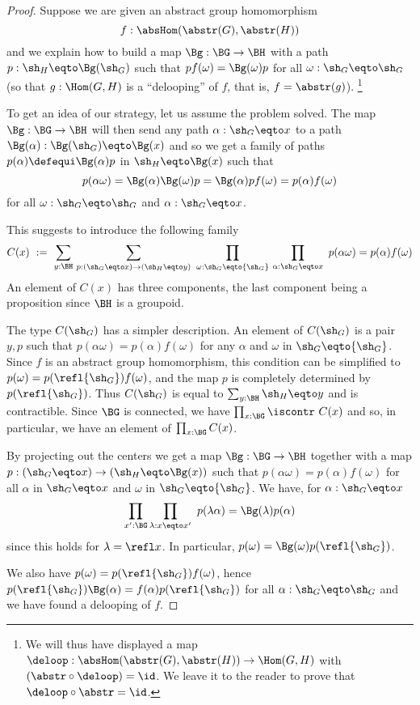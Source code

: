 \begin{proof}
  Suppose we are given an abstract group homomorphism
$$f:\absHom(\abstr(G),\abstr(H))$$
and we explain how to build a map $\Bg:\BG \rightarrow \BH$ with
a path $p:\sh_H \eqto \Bg(\sh_G)$ such that $p f(\omega) = \Bg(\omega) p$
for all $\omega:\sh_G \eqto \sh_G$ (so that $g:\Hom(G,H)$ is a ``delooping'' of $f$, 
that is, $f=\abstr(g)$).%
\footnote{We will thus have displayed a map
$\deloop:\absHom(\abstr(G),\abstr(H))\to\Hom(G,H)$ with 
$({\abstr}\circ\deloop)=\id$. We leave it to the reader 
to prove that $\deloop\circ{\abstr}=\id$. }

To get an idea of our strategy, let us assume the problem solved. The map $\Bg:\BG\rightarrow \BH$
will then send any path $\alpha:\sh_G \eqto x$ to a path $\Bg(\alpha):\Bg(\sh_G) \eqto \Bg(x)$
and so we get a family of paths $p(\alpha) \defequi \Bg(\alpha) p$ in ${\sh_H} \eqto \Bg(x)$ such that
$$p(\alpha\omega) = \Bg(\alpha)\Bg(\omega)p
  = \Bg(\alpha)pf(\omega) = p(\alpha)f(\omega)$$
for all $\omega:\sh_G \eqto \sh_G$ and $\alpha : \sh_G \eqto x$.

This suggests to introduce the following family
$$
C(x)~:=~ \sum_{y:\BH}\,\sum_{p:(\sh_G \eqto x)\rightarrow (\sh_H \eqto y)}~\prod_{\omega:\sh_G \eqto {\sh_G}}\,\prod_{\alpha:\sh_G \eqto x}~
 p(\alpha\omega) = p(\alpha)f(\omega)
$$
 An element of $C(x)$ has three components, the last component being
 a proposition since $\BH$ is a groupoid.

 The type $C({\sh_G})$ has a simpler description. An element of $C({\sh_G})$ is
 a pair $y,p$ such that $p(\alpha\omega) = p(\alpha)f(\omega)$ for
 any $\alpha$ and $\omega$ in $\sh_G \eqto {\sh_G}$.
 Since $f$ is an abstract group homomorphism, this condition
 can be simplified to $p(\omega) = p(\refl{\sh_G})f(\omega)$, and the map $p$
 is completely determined by $p(\refl{\sh_G})$.
 Thus $C({\sh_G})$ is equal to $\sum_{y:\BH}\sh_H \eqto y$ and is contractible.
 Since $\BG$ is connected, we have
 $\prod_{x:\BG}\iscontr~ C(x)$
 and so, in particular, we have an element of $\prod_{x:\BG}C(x)$.

 By projecting out the centers we get a map $\Bg:\BG\rightarrow \BH$
 together with a map $p:({\sh_G}\eqto x)\rightarrow ({\sh_H} \eqto \Bg(x))$ 
 such that $p (\alpha\omega) = p(\alpha) f(\omega)$
 for all $\alpha$ in $\sh_G \eqto x$ and $\omega$ in $\sh_G \eqto {\sh_G}$.
We have, for $\alpha:\sh_G \eqto x$
$$\prod_{x':\BG}\prod_{\lambda:x\eqto x'}~p(\lambda\alpha) = \Bg(\lambda)p(\alpha)$$
since this holds for $\lambda = \refl x$.
In particular, $p(\omega) = \Bg(\omega)p(\refl{\sh_G})$.

We also have $p(\omega) = p(\refl{\sh_G})f(\omega)$, hence
$p(\refl{\sh_G})\Bg(\alpha) =  f(\alpha)p(\refl{\sh_G})$
for all $\alpha:\sh_G\eqto \sh_G$ and we have found a delooping of $f$.
\end{proof}


